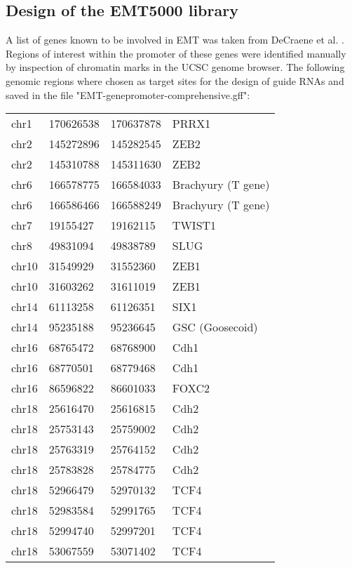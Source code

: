\begin{footnotesize}

\section{Design of the EMT5000  library}
\label{Bioinf_methods: EMT5000 library}

A list of genes known to be involved in EMT was taken from DeCraene et al. \cite{DeCraene:2013kb}. Regions of interest within the promoter of these genes were identified manually by inspection of chromatin marks in the UCSC genome browser. The following genomic regions where chosen as target sites for the design of guide RNAs  and saved in the file "EMT-genepromoter-comprehensive.gff":

\begin{tabular}[H]{llll}
chr1 &	170626538 &	170637878 &	PRRX1 \\
chr2	& 145272896 & 145282545 & ZEB2 \\
chr2 &	145310788 & 145311630 & ZEB2 \\
chr6 &	166578775 & 166584033 & Brachyury (T gene) \\
chr6	& 166586466 & 166588249 & Brachyury (T gene) \\
chr7	& 19155427	 & 19162115 & TWIST1 \\
chr8	& 49831094	 & 49838789 & SLUG \\
chr10 & 31549929 & 31552360 & ZEB1 \\
chr10 & 31603262 & 31611019 & ZEB1 \\
chr14 & 61113258 & 61126351 & SIX1 \\
chr14 & 95235188 & 95236645 & GSC (Goosecoid) \\
chr16 & 68765472 & 68768900 & Cdh1 \\
chr16 & 68770501 & 68779468 & Cdh1 \\
chr16 & 86596822 & 86601033 & FOXC2 \\
chr18 & 25616470 & 25616815 & Cdh2 \\
chr18 & 25753143 & 25759002 & Cdh2 \\
chr18 & 25763319 & 25764152 & Cdh2 \\
chr18 & 25783828 & 25784775 & Cdh2 \\
chr18 & 52966479 & 52970132 & TCF4 \\
chr18 & 52983584 & 52991765 & TCF4 \\
chr18 & 52994740 & 52997201	& TCF4 \\
chr18 & 53067559 & 53071402	& TCF4 \\

\end{tabular}
\end{footnotesize}

